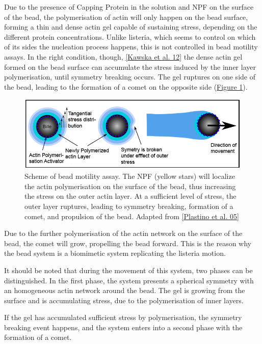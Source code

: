 \documentclass[A4paperpaper,11pt,english]{sphinxmanual}
\begin{document}
Due to the presence of Capping Protein in the solution and NPF on the surface of
the bead, the polymerisation of actin will only happen
on the bead surface, forming a thin and dense actin gel capable of sustaining stress, depending
on the different protein concentrations. Unlike listeria, which
seems to control on which of its sides the nucleation process happens, this is not
controlled in bead motility assays. In the right condition, though,
{\hyperref[parts/part1:kawska2012]{{[}Kawska et al. 12{]}}} the dense actin gel formed on the bead surface can
accumulate the stress induced by the inner layer polymerisation, until symmetry
breaking occurs. The gel ruptures on one side of the bead, leading to
the formation of a comet on the opposite side (\hyperref[parts/part1:fig-bead-motility]{Figure  \ref*{parts/part1:fig-bead-motility}}).
\begin{figure}[htbp]
\centering
\capstart

\includegraphics[width=0.600\linewidth]{Plastino-Sykes-2005.png}
\caption{Scheme of bead motility assay. The NPF (yellow stars) will localize the
actin polymerisation on the surface of the bead, thus increasing the stress on
the outer actin layer. At a sufficient level of stress, the outer layer
ruptures, leading to symmetry breaking, formation of a comet, and
propulsion of the bead. Adapted from {\hyperref[parts/part1:plastino2005]{{[}Plastino et al. 05{]}}}}\label{parts/part1:fig-bead-motility}\end{figure}

Due to the further polymerisation of the actin network on the surface of the bead,
the comet will grow, propelling the bead forward. This is the reason why the bead
system is a biomimetic system replicating the listeria motion.

It should be noted that during the movement of this system, two phases can be
distinguished. In the first phase, the system presents a spherical symmetry with
an homogeneous actin  network around the bead. The gel is growing from the
surface and is accumulating stress, due to the polymerisation of inner layers.

If the gel has accumulated sufficient stress by polymerisation,  the symmetry breaking event happens, and the system enters into
a second phase with the formation of a comet.
\end{document}
